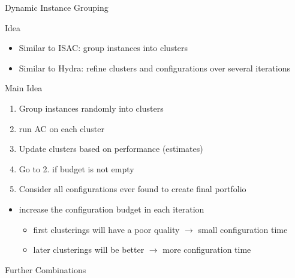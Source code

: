 \begin{frame}[c]{Dynamic Instance Grouping }

\begin{block}{Idea}
\begin{itemize}
  \item Similar to ISAC: group instances into clusters
  \item Similar to Hydra: refine clusters and configurations over several iterations 
\end{itemize}
\end{block}

\pause

\begin{block}{Main Idea}
\begin{enumerate}
  \item Group instances randomly into clusters
  \item run AC on each cluster
  \item Update clusters based on performance (estimates)
  \item Go to 2. if budget is not empty
  \item Consider all configurations ever found to create final portfolio
\end{enumerate}

\pause

\begin{itemize}
  \item increase the configuration budget in each iteration
  \begin{itemize}
    \item first clusterings will have a poor quality $\to$ small configuration time
    \item later clusterings will be better $\to$ more configuration time
  \end{itemize}
\end{itemize}

\end{block}

\end{frame}
\begin{frame}[c]{Further Combinations}

\centering
\scalebox{0.8}{

}

\end{frame}
